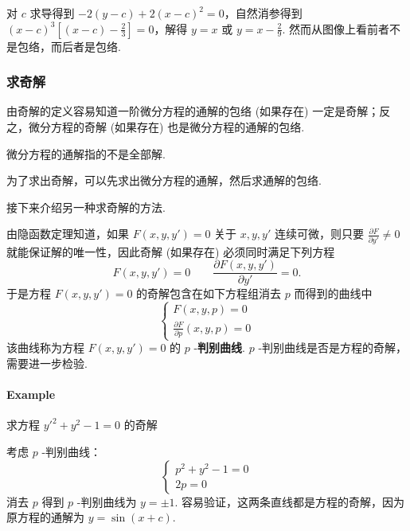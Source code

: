 对 $\displaystyle c$ 求导得到 $\displaystyle -2(y-c)+2(x-c)^{2}=0$，自然消参得到 $\displaystyle (x-c)^{3}\left[ (x-c)-\frac{2}{3} \right]=0$，解得 $\displaystyle y=x$ 或 $\displaystyle y=x-\frac{2}{9}$. 然而从图像上看前者不是包络，而后者是包络.

\subsubsection{求奇解}

由奇解的定义容易知道一阶微分方程的通解的包络 (如果存在) 一定是奇解；反之，微分方程的奇解 (如果存在) 也是微分方程的通解的包络.

\begin{note}

    微分方程的通解指的不是全部解.
\end{note}
为了求出奇解，可以先求出微分方程的通解，然后求通解的包络.

接下来介绍另一种求奇解的方法.

由隐函数定理知道，如果 $\displaystyle F(x,y,y')=0$ 关于 $\displaystyle x,y,y'$ 连续可微，则只要 $\displaystyle \frac{ \partial F }{ \partial y' }\neq0$ 就能保证解的唯一性，因此奇解 (如果存在) 必须同时满足下列方程
$$
    F(x,y,y')=0\qquad \frac{ \partial F(x,y,y') }{ \partial y' } =0.
$$
于是方程 $\displaystyle F(x,y,y')=0$ 的奇解包含在如下方程组消去 $p$ 而得到的曲线中
$$
    \left\{\begin{array}{l}
        F(x,y,p)=0 \\
        \frac{ \partial F }{ \partial p } (x,y,p)=0
    \end{array}\right.
$$
该曲线称为方程 $\displaystyle F(x,y,y')=0$ 的 $p$ -\textbf{判别曲线}. $\displaystyle p$ -判别曲线是否是方程的奇解，需要进一步检验.

\paragraph{Example}

\begin{example}
    求方程 $\displaystyle y'^{2}+y^{2}-1=0$ 的奇解
\end{example}

考虑 $p$ -判别曲线：
$$
    \left\{\begin{array}{l}
        p^{2}+y^{2}-1=0 \\
        2p=0
    \end{array}\right.
$$
消去 $p$ 得到 $p$ -判别曲线为 $\displaystyle y=\pm1$. 容易验证，这两条直线都是方程的奇解，因为原方程的通解为 $\displaystyle y=\sin(x+c)$.

